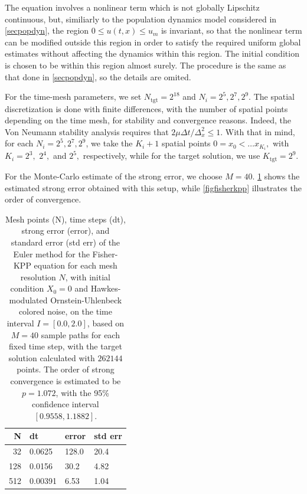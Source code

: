 \documentclass[reqno,12pt]{amsart}
\theoremstyle{plain} %
\theoremstyle{definition} %
\begin{document}
The equation involves a nonlinear term which is not globally Lipschitz continuous, but, similiarly to the population dynamics model considered in \cref{secpopdyn}, the region $0 \leq u(t, x) \leq u_m$ is invariant, so that the nonlinear term can be modified outside this region in order to satisfy the required uniform global estimates without affecting the dynamics within this region. The initial condition is chosen to be within this region almost surely. The procedure is the same as that done in \cref{secpopdyn}, so the details are omited.

For the time-mesh parameters, we set $N_{\textrm{tgt}} = 2^{18}$ and $N_i = 2^5, 2^7, 2^9.$ The spatial discretization is done with finite differences, with the number of spatial points depending on the time mesh, for stability and convergence reasons. Indeed, the Von Neumann stability analysis requires that $2\mu\Delta t / \Delta_x^2 \leq 1.$ With that in mind, for each $N_i = 2^5, 2^7, 2^9$, we take the $K_i + 1$ spatial points $0 = x_0 < \ldots x_{K_i},$ with $K_i = 2^3,$ $2^4,$ and $2^5,$ respectively, while for the target solution, we use $K_{\textrm{tgt}} = 2^9.$

For the Monte-Carlo estimate of the strong error, we choose $M = 40.$ \cref{tablefisherkpp} shows the estimated strong error obtained with this setup, while \cref{figfisherkpp} illustrates the order of convergence.

\begin{table}
    \begin{tabular}[htb]{|r|l|l|l|}
        \hline N & dt & error & std err \\
        \hline \hline
        32 & 0.0625 & 128.0 & 20.4 \\
        128 & 0.0156 & 30.2 & 4.82 \\
        512 & 0.00391 & 6.53 & 1.04 \\
        \hline
    \end{tabular}
    \bigskip

    \caption{Mesh points (N), time steps (dt), strong error (error), and standard error (std err) of the Euler method for the Fisher-KPP equation for each mesh resolution $N$, with initial condition $X_0 = 0$ and Hawkes-modulated Ornstein-Uhlenbeck colored noise, on the time interval $I = [0.0, 2.0]$, based on $M = 40$ sample paths for each fixed time step, with the target solution calculated with $262144$ points. The order of strong convergence is estimated to be $p = 1.072$, with the 95\% confidence interval $[0.9558, 1.1882]$.}
    \label{tablefisherkpp}
\end{table}
\end{document}
